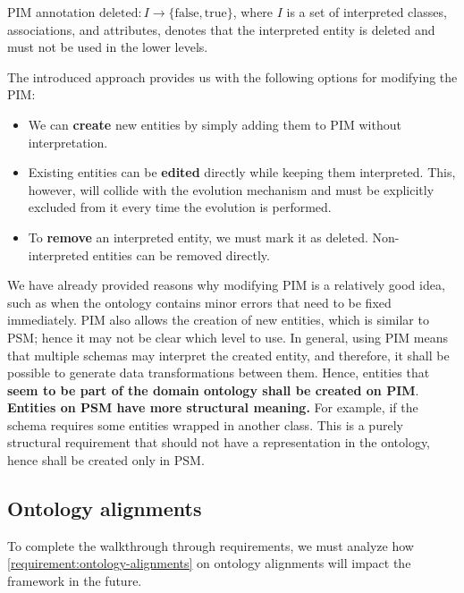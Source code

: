 \begin{definition}[deleted]
    PIM annotation $\textrm{deleted}: I \rightarrow \{\textrm{false}, \textrm{true}\}$, where $I$ is a set of interpreted classes, associations, and attributes, denotes that the interpreted entity is deleted and must not be used in the lower levels.
\end{definition}

\medskip

The introduced approach provides us with the following options for modifying the PIM:
\begin{itemize}
    \item We can \textbf{create} new entities by simply adding them to PIM without interpretation.
    \item Existing entities can be \textbf{edited} directly while keeping them interpreted. This, however, will collide with the evolution mechanism and must be explicitly excluded from it every time the evolution is performed.
    \item To \textbf{remove} an interpreted entity, we must mark it as deleted. Non-in\-ter\-pre\-ted entities can be removed directly.
\end{itemize}

We have already provided reasons why modifying PIM is a relatively good idea, such as when the ontology contains minor errors that need to be fixed immediately. PIM also allows the creation of new entities, which is similar to PSM; hence it may not be clear which level to use. In general, using PIM means that multiple schemas may interpret the created entity, and therefore, it shall be possible to generate data transformations between them. Hence, entities that \textbf{seem to be part of the domain ontology shall be created on PIM}. \textbf{Entities on PSM have more structural meaning.} For example, if the schema requires some entities wrapped in another class. This is a purely structural requirement that should not have a representation in the ontology, hence shall be created only in PSM.

\subsection{Ontology alignments}\label{sec:ontology-alignments}

To complete the walkthrough through requirements, we must analyze how \autoref{requirement:ontology-alignments} on ontology alignments will impact the framework in the future.

